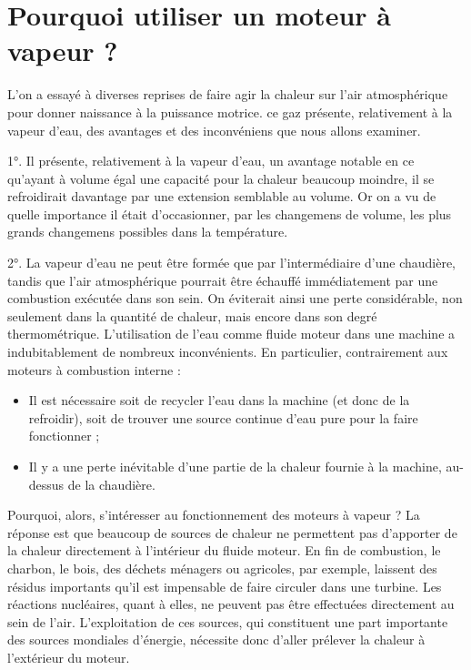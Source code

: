 \section{Pourquoi utiliser un moteur à vapeur ?}

		L’on a essayé à diverses reprises de faire agir la chaleur sur l’air atmosphérique pour donner naissance à la puissance motrice. ce gaz présente, relativement à la vapeur d’eau, des avantages et des inconvéniens que nous allons examiner.
		
	1°. Il présente, relativement à la vapeur d’eau, un avantage notable en ce qu’ayant à volume égal une capacité pour la chaleur beaucoup moindre, il se refroidirait davantage par une extension semblable au volume. \jecourte Or on a vu de quelle importance il était d’occasionner, par les changemens de volume, les plus grands changemens possibles dans la température.
	
	2°. La vapeur d’eau ne peut être formée que par l’intermédiaire d’une chaudière, tandis que l’air atmosphérique pourrait être échauffé immédiatement par une combustion exécutée dans son sein. On éviterait ainsi une perte considérable, non seulement dans la quantité de chaleur, mais encore dans son degré thermométrique.
	L’utilisation de l’eau comme fluide moteur dans une machine a indubitablement de nombreux inconvénients. En particulier, contrairement aux moteurs à combustion interne :
	\begin{itemize}
		\item Il est nécessaire soit de recycler l’eau dans la machine (et donc de la refroidir), soit de trouver une source continue d’eau pure pour la faire \mbox{fonctionner} ;
		\item Il y a une perte inévitable d’une partie de la chaleur fournie à la machine, au-dessus de la chaudière.
	\end{itemize}

	Pourquoi, alors, s’intéresser au fonctionnement des moteurs à vapeur ? La réponse est que beaucoup de sources de chaleur ne permettent pas d’apporter de la chaleur directement à l’intérieur du fluide moteur. En fin de combustion, le charbon, le bois, des déchets ménagers ou agricoles, par exemple, laissent des résidus importants qu’il est impensable de faire circuler dans une turbine. Les réactions nucléaires, quant à elles, ne peuvent pas être effectuées directement au sein de l’air. L’exploitation de ces sources, qui constituent une part importante des sources mondiales d’énergie, nécessite donc d’aller prélever la chaleur à l’extérieur du moteur.

